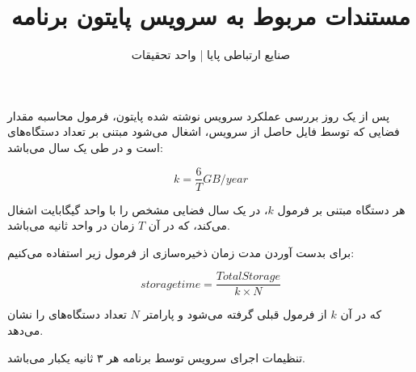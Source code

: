 \documentclass[a4paper]{article}
\title{مستندات مربوط به سرویس پایتون برنامه \lr{PSIM}}
\author{صنایع ارتباطی پایا | واحد تحقیقات}
\begin{document}
\maketitle

پس از یک روز بررسی عملکرد سرویس نوشته شده پایتون، فرمول محاسبه مقدار فضایی که
توسط فایل  حاصل از سرویس، اشغال می‌شود مبتنی بر تعداد دستگاه‌های
 است و در طی یک سال می‌باشد:

\begin{equation}
    k = \frac{6}{T} GB/year
\end{equation}

هر دستگاه  مبتنی بر فرمول $k$، در یک سال فضایی مشخص را با واحد گیگابایت
اشغال می‌کند، که در آن $T$ زمان در واحد ثانیه می‌باشد.

برای بدست آوردن مدت زمان ذخیره‌سازی از فرمول زیر استفاده می‌کنیم:

\begin{equation}
    storage time = \frac{Total Storage}{k \times N}    
\end{equation}

که در آن $k$ از فرمول قبلی گرفته می‌شود و پارامتر $N$ تعداد دستگاه‌های 
را نشان می‌دهد.

تنظیمات اجرای سرویس توسط برنامه  هر ۳ ثانیه یکبار می‌باشد.
\end{document}

